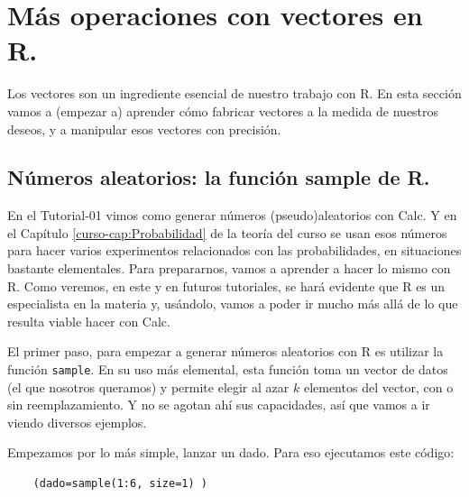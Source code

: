 \documentclass[10pt,a4paper]{article}\usepackage[]{graphicx}\usepackage[]{color}
\begin{document}
\section{Más operaciones con vectores en R.}

Los vectores son un ingrediente esencial de nuestro trabajo con R. En esta sección vamos a (empezar a) aprender cómo fabricar vectores a la medida de nuestros deseos, y a manipular esos vectores con precisión.


\subsection{Números aleatorios: la función sample de R.}
\label{tut02:subsec:NumerosAleatoriosRSample}

En el Tutorial-01 vimos como generar números (pseudo)aleatorios con Calc. Y en el Capítulo \ref{curso-cap:Probabilidad} de la teoría del curso se usan esos números para hacer varios experimentos relacionados con las probabilidades, en situaciones bastante elementales. Para prepararnos, vamos a aprender a hacer lo mismo con R. Como veremos, en este y en futuros tutoriales, se hará evidente que R es un especialista en la materia y, usándolo, vamos a poder ir mucho más allá de lo que resulta viable hacer con Calc.

El primer paso, para empezar a generar números aleatorios con R es utilizar la función {\tt sample}. En su uso más elemental, esta función toma un vector de datos (el que nosotros queramos) y permite elegir al azar $k$ elementos del vector, con o sin reemplazamiento. Y no se agotan ahí sus capacidades, así que vamos a ir viendo diversos ejemplos.

Empezamos por lo más simple, lanzar un dado. Para eso ejecutamos este código:
\begin{verbatim}
    (dado=sample(1:6, size=1) )
\end{verbatim}
\end{document}
